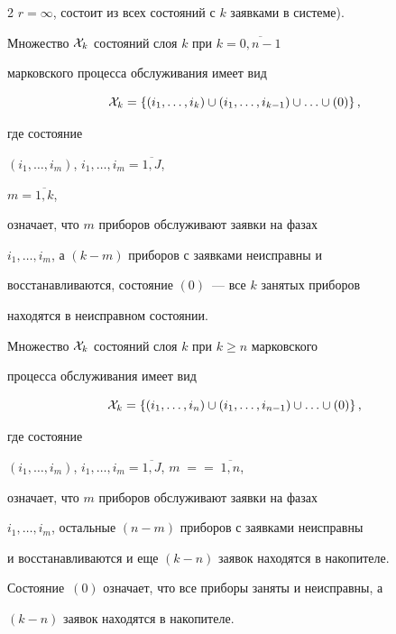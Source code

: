 \begin{multicols}{2}
$r=\infty$, состоит из всех состояний с $k$ заявками в системе).





Множество ${\cal X}_k$ состояний слоя $k$ при $k=\overline{0,n-1}$


марковского процесса обслуживания имеет вид


$$


{\cal X}_k


=


\{(i_1,\ldots,i_k)\cup (i_1,\ldots,i_{k-1})\cup\ldots\cup(0)\}\,,


$$


где состояние


$(i_1,\ldots,i_m)$,  $i_1,\ldots,i_m=\overline{1,J}$,\linebreak


$m=\overline{1,k}$,


означает, что $m$ приборов обслуживают заявки на фазах


$i_1,\ldots,i_m$, а $(k-m)$ приборов с заявками неисправны и


восстанавливаются, состояние $(0)$~--- все $k$ занятых приборов


находятся в неисправном состоянии.





Множество ${\cal X}_k$ состояний слоя $k$ при $k\ge n$ марковского


процесса обслуживания имеет вид


$$


{\cal X}_k


=


\{(i_1,\ldots,i_n)\cup (i_1,\ldots,i_{n-1})\cup\ldots\cup(0)\}\,,


$$


где состояние


$(i_1,\ldots,i_m)$, $i_1,\ldots,i_m=\overline{1,J}$, $m\;=$\linebreak $=\;\overline{1,n}$,


означает, что $m$ приборов обслуживают заявки на фазах


$i_1,\ldots,i_m$, остальные $(n-m)$ приборов с заявками неисправны


и восстанавливаются и еще $(k-n)$ заявок находятся в накопителе.


Состояние~$(0)$ означает, что все приборы заняты и неисправны, а


$(k-n)$ заявок находятся в накопителе.






\end{multicols}
